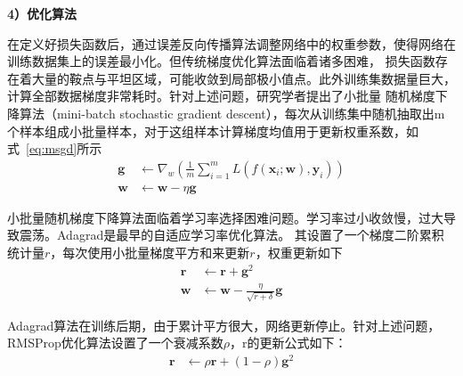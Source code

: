 \textbf{4）优化算法}

在定义好损失函数后，通过误差反向传播算法调整网络中的权重参数，使得网络在训练数据集上的误差最小化。但传统梯度优化算法面临着诸多困难，
损失函数存在着大量的鞍点与平坦区域，可能收敛到局部极小值点。此外训练集数据量巨大，计算全部数据梯度非常耗时。针对上述问题，研究学者提出了小批量
随机梯度下降算法（mini-batch stochastic gradient descent），每次从训练集中随机抽取出m个样本组成小批量样本，对于这组样本计算梯度均值用于更新权重系数，如式~\ref{eq:msgd}所示
\begin{equation}
  \begin{aligned}
    \boldsymbol{g}  & \leftarrow \nabla_{w}\left(\frac{1}{m} \sum_{i=1}^{m} L\left(f\left(\boldsymbol{x}_{i} ; \boldsymbol{w}\right), \boldsymbol{y}_{i}\right)\right) \\
    \boldsymbol{w}  & \leftarrow  \boldsymbol{w} - \eta \boldsymbol{g}
  \end{aligned}
  \label{eq:msgd}
\end{equation}

小批量随机梯度下降算法面临着学习率选择困难问题。学习率过小收敛慢，过大导致震荡。Adagrad\cite{lydia2019adagrad}是最早的自适应学习率优化算法。
其设置了一个梯度二阶累积统计量$r$，每次使用小批量梯度平方和来更新$r$，权重更新如下
\begin{equation}
  \begin{aligned}
    \boldsymbol{r}  & \leftarrow   \boldsymbol{r}  +  \boldsymbol{g}^2\\
    \boldsymbol{w}  & \leftarrow  \boldsymbol{w} - \frac{\eta}{\sqrt{r + \delta}} \boldsymbol{g}
  \end{aligned}
  \label{eq:adagrad}
\end{equation}

Adagrad算法在训练后期，由于累计平方很大，网络更新停止。针对上述问题，RMSProp优化算法设置了一个衰减系数$\rho$，r的更新公式如下：
\begin{equation}
  \begin{aligned}
    \boldsymbol{r}  & \leftarrow  \rho \boldsymbol{r}  + (1-\rho) \boldsymbol{g}^2\\
  \end{aligned}
  \label{eq:Rmsprop}
\end{equation}

